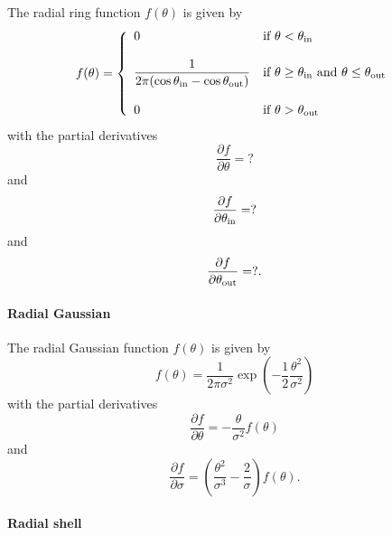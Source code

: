 \documentclass{article}[12pt,a4]
\begin{document}
The radial ring function $f(\theta)$ is given by
\begin{equation}
f(\theta) = \left \{
   \begin{array}{l l}
     \displaystyle 0 & \mbox{if $\theta < \theta_{\rm in}$} \\ \\
     \displaystyle \frac{1}{2 \pi (\cos \theta_{\rm in} - \cos \theta_{\rm out})} & \mbox{if $\theta \ge \theta_{\rm in}$ and $\theta \le \theta_{\rm out}$} \\ \\
     \displaystyle 0 & \mbox{if $\theta > \theta_{\rm out}$}
   \end{array}
   \right .
\end{equation}
with the partial derivatives
\begin{equation}
\frac{\partial f}{\partial \theta}  = ?
\end{equation}
and
\begin{equation}
\frac{\partial f}{\partial \theta_{\rm in}}  = ?
\end{equation}
and
\begin{equation}
\frac{\partial f}{\partial \theta_{\rm out}}  = ? .
\end{equation}

\paragraph{Radial Gaussian}

The radial Gaussian function $f(\theta)$ is given by
\begin{equation}
f(\theta) = \frac{1}{2 \pi \sigma^2} \exp \left( -\frac{1}{2} \frac{\theta^2}{\sigma^2} \right)
\end{equation}
with the partial derivatives
\begin{equation}
\frac{\partial f}{\partial \theta}  = - \frac{\theta}{\sigma^2} f(\theta)
\end{equation}
and
\begin{equation}
\frac{\partial f}{\partial \sigma}  = \left( \frac{\theta^2}{\sigma^3} - \frac{2}{\sigma} \right) f(\theta) .
\end{equation}

\paragraph{Radial shell}
\end{document}
